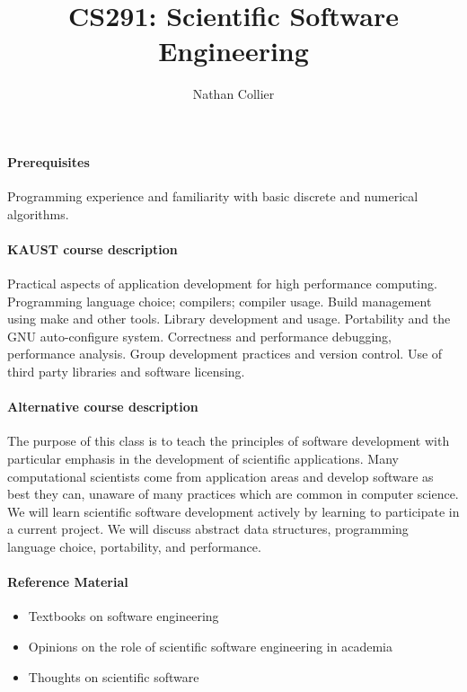 \documentclass[12 pt]{article}
\title{CS291: Scientific Software Engineering}
\author{Nathan Collier}
\begin{document}
\maketitle
\paragraph{Prerequisites} Programming experience and familiarity with basic discrete and numerical algorithms.

\paragraph{KAUST course description}

Practical aspects of application development for high performance computing. Programming language choice; compilers; compiler usage. Build management using make and other tools. Library development and usage. Portability and the GNU auto-configure system. Correctness and performance debugging, performance analysis. Group development practices and version control. Use of third party libraries and software licensing.

\paragraph{Alternative course description}

The purpose of this class is to teach the principles of software development with particular emphasis in the development of scientific applications. Many computational scientists come from application areas and develop software as best they can, unaware of many practices which are common in computer science. We will learn scientific software development actively by learning to participate in a current project. We will discuss abstract data structures, programming language choice, portability, and performance. 

\paragraph{Reference Material}

\begin{itemize}
\item Textbooks on software engineering \cite{Sommerville2011,Nanz2011}
\item Opinions on the role of scientific software engineering in academia \cite{Todorov2012,Dirk2012}
\item Thoughts on scientific software \cite{Katzgraber2010,Hannay2009,Smith2007}
\end{itemize}
\end{document}
